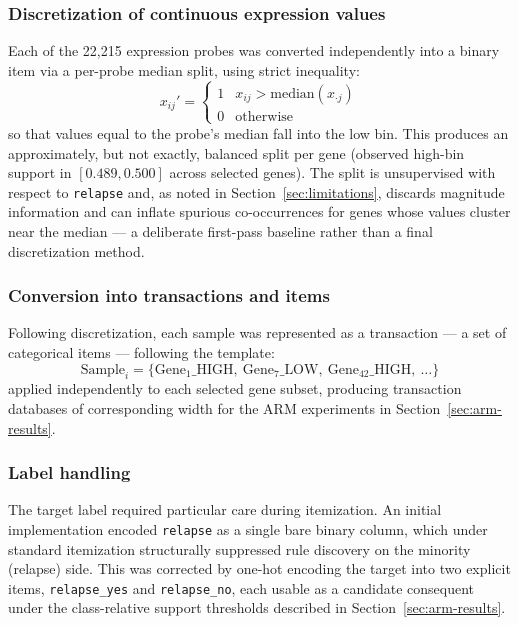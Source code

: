 \documentclass[twocolumn]{article}
\begin{document}
\subsubsection{Discretization of continuous expression values}
Each of the 22{,}215 expression probes was converted independently into a
binary item via a per-probe median split, using strict inequality:
\begin{equation}
x_{ij}' = \begin{cases} 1 & x_{ij} > \mathrm{median}(x_{\cdot j}) \\ 0 & \text{otherwise} \end{cases}
\end{equation}
so that values equal to the probe's median fall into the low bin. This
produces an approximately, but not exactly, balanced split per gene (observed
high-bin support in $[0.489, 0.500]$ across selected genes). The split is
unsupervised with respect to \texttt{relapse} and, as noted in
Section~\ref{sec:limitations}, discards magnitude information and can
inflate spurious co-occurrences for genes whose values cluster near the
median — a deliberate first-pass baseline rather than a final discretization
method.

\subsubsection{Conversion into transactions and items}
Following discretization, each sample was represented as a transaction —
a set of categorical items — following the template:
\[
\text{Sample}_i = \{\text{Gene}_1\_\text{HIGH},\ \text{Gene}_7\_\text{LOW},\
\text{Gene}_{42}\_\text{HIGH},\ \ldots\}
\]
applied independently to each selected gene subset, producing transaction
databases of corresponding width for the ARM experiments in
Section~\ref{sec:arm-results}.

\subsubsection{Label handling}
The target label required particular care during itemization. An initial
implementation encoded \texttt{relapse} as a single bare binary column,
which under standard itemization structurally suppressed rule discovery on
the minority (relapse) side. This was corrected by one-hot encoding the
target into two explicit items, \texttt{relapse\_yes} and
\texttt{relapse\_no}, each usable as a candidate consequent under the
class-relative support thresholds described in Section~\ref{sec:arm-results}.
\end{document}
